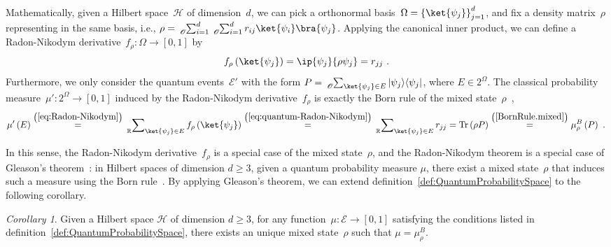 \documentclass{article}
\theoremstyle{remark}
\newtheorem{cor}{Corollary}
\newcommand{\events}{\ensuremath{\mathcal{E}}}
\newcommand{\pmeas}{\ensuremath{\mu}}
\newcommand{\Hilb}{\mathcal{H}}
\newcommand{\proj}[1]{|#1 \rangle\langle #1 |}
\newcommand{\Tr}{\mathop{\mathrm{Tr}}\nolimits}
\begin{document}
Mathematically, given a Hilbert space~$\Hilb$ of dimension~$d$,
we can pick a orthonormal basis~$\Omega=\left\{ \ket{\psi_{j}}\right\} _{j=1}^{d}$,
and fix a density matrix~$\rho$ representing in the same basis,
i.e., $\rho=\tensor*[_{\mathscr{O}}]{\sum}{_{i=1}^{d}}\tensor*[_{\mathscr{O}}]{\sum}{_{i=1}^{d}}r_{ij}\ket{\psi_{i}}\bra{\psi_{j}}$.
Applying the canonical inner product, we can define a Radon-Nikodym
derivative~$f_{\rho}:\Omega\rightarrow[0,1]$ by
\begin{equation}
f_{\rho}\left(\ket{\psi_{j}}\right)=\ip{\psi_{j}}{\rho\psi_{j}}=r_{jj}\textrm{ .}\label{eq:quantum-Radon-Nikodym}
\end{equation}
Furthermore, we only consider the quantum events~$\events'$ with
the form $P=\tensor*[_{\mathscr{O}}]{\sum}{_{\ket{\psi_{j}}\in E}}\proj{\psi_{j}}$,
where $E\in2^{\Omega}$. The classical probability measure~$\pmeas':2^{\Omega}\rightarrow[0,1]$
induced by the Radon-Nikodym derivative~$f_{\rho}$ is exactly the
Born rule of the mixed state~$\rho$~\cite{Maassen2010}, 
\begin{equation}
\pmeas'\left(E\right)\overset{\left(\ref{eq:Radon-Nikodym}\right)}{=}\sideset{_{\mathbb{R}}}{_{\ket{\psi_{j}}\in E}}\sum f_{\rho}\left(\ket{\psi_{j}}\right)\overset{\left(\ref{eq:quantum-Radon-Nikodym}\right)}{=}\sideset{_{\mathbb{R}}}{_{\ket{\psi_{j}}\in E}}\sum r_{jj}=\Tr\left(\rho P\right)\overset{\left(\ref{BornRule.mixed}\right)}{=}\mu_{\rho}^{B}\left(P\right)\textrm{ .}\label{BornRule.mixed-1}
\end{equation}

In this sense, the Radon-Nikodym derivative~$f_{\rho}$ is a special
case of the mixed state~$\rho$, and the Radon-Nikodym theorem is
a special case of Gleason's theorem~\cite{HollandJr1970,Redhead1987-REDINA,Jaeger2007}:
in Hilbert spaces of dimension $d\geq3$, given a quantum probability
measure $\mu$, there exist a mixed state~$\rho$ that induces such
a measure using the Born rule~\cite{gleason1957,Redhead1987-REDINA,peres1995quantum}.
By applying Gleason's theorem, we can extend definition~\ref{def:QuantumProbabilitySpace}
to the following corollary.

\begin{cor}\label{cor:Gleason's}Given a Hilbert space $\Hilb$ of
dimension $d\geq3$, for any function~$\mu:\events\rightarrow[0,1]$
satisfying the conditions listed in definition~\ref{def:QuantumProbabilitySpace},
there exists an unique mixed state~$\rho$ such that $\mu=\mu_{\rho}^{B}$.\end{cor}
\end{document}
